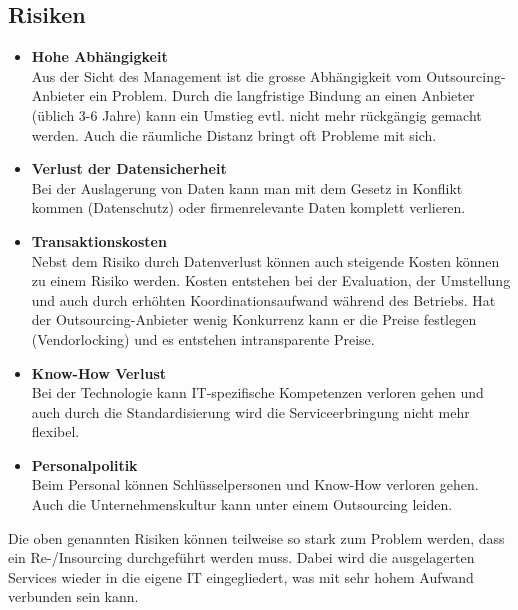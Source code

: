 \subsection{Risiken}
\begin{itemize}
	\item \textbf{Hohe Abhängigkeit} \\
	Aus der Sicht des Management ist die grosse Abhängigkeit vom Outsourcing-Anbieter ein Problem. Durch die langfristige Bindung an einen Anbieter (üblich 3-6 Jahre) kann ein Umstieg evtl. nicht mehr rückgängig gemacht werden. Auch die räumliche Distanz bringt oft Probleme mit sich. 
	\item \textbf{Verlust der Datensicherheit} \\
	Bei der Auslagerung von Daten kann man mit dem Gesetz in Konflikt kommen (Datenschutz) oder firmenrelevante Daten komplett verlieren.
	\item \textbf{Transaktionskosten}\\
	Nebst dem Risiko durch Datenverlust können auch steigende Kosten können zu einem Risiko werden. Kosten entstehen bei der Evaluation, der Umstellung und auch durch erhöhten Koordinationsaufwand während des Betriebs. Hat der Outsourcing-Anbieter wenig Konkurrenz kann er die Preise festlegen (Vendorlocking) und es entstehen intransparente Preise.
	\item \textbf{Know-How Verlust}\\
	Bei der Technologie kann IT-spezifische Kompetenzen verloren gehen und auch durch die Standardisierung wird die Serviceerbringung nicht mehr flexibel.
	\item \textbf{Personalpolitik}\\
	Beim Personal können Schlüsselpersonen und Know-How verloren gehen. Auch die Unternehmenskultur kann unter einem Outsourcing leiden.
\end{itemize}
Die oben genannten Risiken können teilweise so stark zum Problem werden, dass ein Re-/Insourcing durchgeführt werden muss. Dabei wird die ausgelagerten Services wieder in die eigene IT eingegliedert, was mit sehr hohem Aufwand verbunden sein kann.

